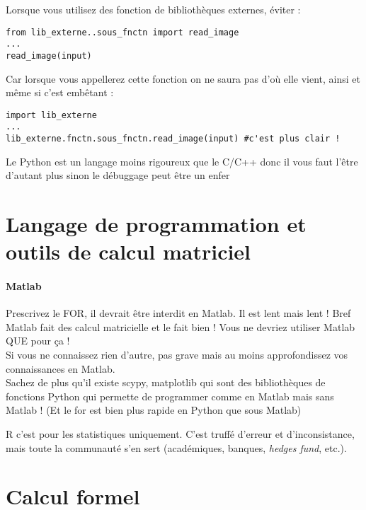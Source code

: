 Lorsque vous utilisez des fonction de bibliothèques externes, éviter : \\

\begin{lstlisting}[style=pythonsty]
from lib_externe..sous_fnctn import read_image
...
read_image(input)
\end{lstlisting}
Car lorsque vous appellerez cette fonction on ne saura pas d'où elle vient, ainsi et même si 
c'est embêtant : \\

\begin{lstlisting}[style=pythonsty]
import lib_externe
...
lib_externe.fnctn.sous_fnctn.read_image(input) #c'est plus clair !
\end{lstlisting}
Le Python est un langage moins rigoureux que le C/C++ donc il vous faut l'être d'autant plus
 sinon le débuggage peut être un enfer 




\section{Langage de programmation et outils de calcul matriciel}



\paragraph{Matlab}

Prescrivez le FOR, il devrait être interdit en Matlab. Il est lent mais lent ! Bref Matlab 
fait des calcul matricielle et le fait bien ! Vous ne devriez utiliser Matlab QUE pour ça !\\

Si vous ne connaissez rien d'autre, pas grave mais au moins approfondissez vos connaissances 
en Matlab.\\

Sachez de plus qu'il existe scypy, matplotlib  qui sont des bibliothèques de fonctions Python 
qui permette de programmer comme en Matlab mais sans Matlab ! (Et le for est bien plus rapide 
en Python que sous Matlab)\\




R c'est pour les statistiques uniquement. C'est truffé d'erreur et d'inconsistance, mais
toute la communauté s'en sert (académiques, banques, \textit{hedges fund}, etc.).

\section{Calcul formel}




